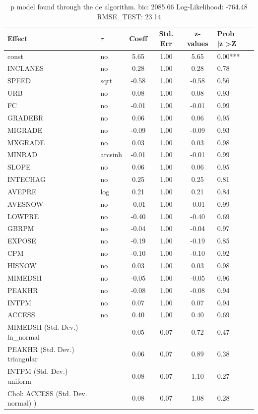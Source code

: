 \begin{table}
	\caption{p model found through the de algorithm. bic: 2085.66 Log-Likelihood: -764.48 RMSE_TEST: 23.14}
	\begin{center}
		\begin{tabular}{|l|l|c|c|c|l|}
			\hline
			Effect & $\tau$ & Coeff & Std. Err & z-values & Prob |z|>Z \\
			\hline
			const & no & 5.65 & 1.00 & 5.65 & 0.00*** \\
			\hline
			INCLANES & no & 0.28 & 1.00 & 0.28 & 0.78 \\
			\hline
			SPEED & sqrt & -0.58 & 1.00 & -0.58 & 0.56 \\
			\hline
			URB & no & 0.08 & 1.00 & 0.08 & 0.93 \\
			\hline
			FC & no & -0.01 & 1.00 & -0.01 & 0.99 \\
			\hline
			GRADEBR & no & 0.06 & 1.00 & 0.06 & 0.95 \\
			\hline
			MIGRADE & no & -0.09 & 1.00 & -0.09 & 0.93 \\
			\hline
			MXGRADE & no & 0.03 & 1.00 & 0.03 & 0.98 \\
			\hline
			MINRAD & arcsinh & -0.01 & 1.00 & -0.01 & 0.99 \\
			\hline
			SLOPE & no & 0.06 & 1.00 & 0.06 & 0.95 \\
			\hline
			INTECHAG & no & 0.25 & 1.00 & 0.25 & 0.81 \\
			\hline
			AVEPRE & log & 0.21 & 1.00 & 0.21 & 0.84 \\
			\hline
			AVESNOW & no & -0.01 & 1.00 & -0.01 & 0.99 \\
			\hline
			LOWPRE & no & -0.40 & 1.00 & -0.40 & 0.69 \\
			\hline
			GBRPM & no & -0.04 & 1.00 & -0.04 & 0.97 \\
			\hline
			EXPOSE & no & -0.19 & 1.00 & -0.19 & 0.85 \\
			\hline
			CPM & no & -0.10 & 1.00 & -0.10 & 0.92 \\
			\hline
			HISNOW & no & 0.03 & 1.00 & 0.03 & 0.98 \\
			\hline
			MIMEDSH & no & -0.05 & 1.00 & -0.05 & 0.96 \\
			\hline
			PEAKHR & no & -0.08 & 1.00 & -0.08 & 0.94 \\
			\hline
			INTPM & no & 0.07 & 1.00 & 0.07 & 0.94 \\
			\hline
			ACCESS & no & 0.40 & 1.00 & 0.40 & 0.69 \\
			\hline
			MIMEDSH (Std. Dev.) ln_normal &  & 0.05 & 0.07 & 0.72 & 0.47 \\
			\hline
			PEAKHR (Std. Dev.) triangular &  & 0.06 & 0.07 & 0.89 & 0.38 \\
			\hline
			INTPM (Std. Dev.) uniform &  & 0.08 & 0.07 & 1.10 & 0.27 \\
			\hline
			 Chol: ACCESS (Std. Dev. normal) ) &  & 0.08 & 0.07 & 1.08 & 0.28 \\
			\hline
		\end{tabular}
	\end{center}
\end{table}